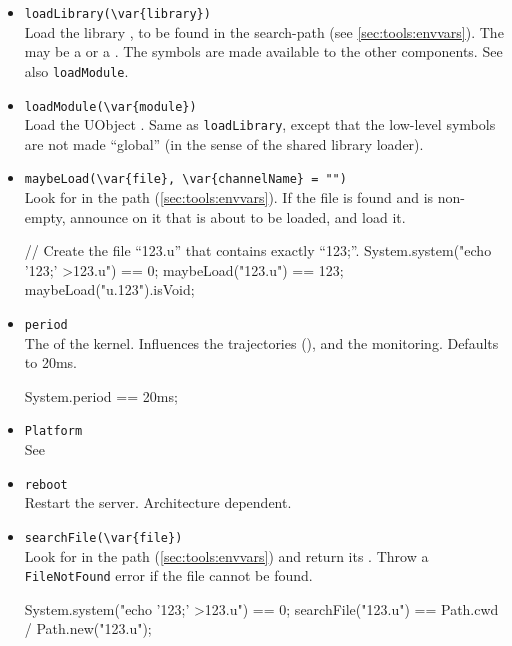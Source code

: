 \begin{itemize}
\item \lstinline|loadLibrary(\var{library})|\\
  Load the library , to be found in the
   search-path (see
  \autoref{sec:tools:envvars}).  The  may be a
   or a .  The \Cxx symbols are made
  available to the other \Cxx components.  See also
  \lstinline|loadModule|.

\item \lstinline|loadModule(\var{module})|\\
  Load the UObject .  Same as \lstinline|loadLibrary|,
  except that the low-level \Cxx symbols are not made ``global'' (in
  the sense of the shared library loader).

\item \lstinline|maybeLoad(\var{file}, \var{channelName} = "")|\\
  Look for  in the \urbi path
  (\autoref{sec:tools:envvars}).  If the file is found and
   is non-empty, announce on it that  is
  about to be loaded, and load it.

\begin{urbiassert}
// Create the file ``123.u'' that contains exactly ``123;''.
System.system("echo '123;' >123.u") == 0;
maybeLoad("123.u") == 123;
maybeLoad("u.123").isVoid;
\end{urbiassert}

\item \lstinline|period|\\
  The  of the \urbi kernel.  Influences the trajectories
  (), and the \uobject monitoring.
  Defaults to 20ms.
\begin{urbiassert}
System.period == 20ms;
\end{urbiassert}

\item \lstinline|Platform|\\
  See 

\item \lstinline|reboot|\\
  Restart the \urbi server.  Architecture dependent.

\item \lstinline|searchFile(\var{file})|\\
  Look for  in the \urbi path (\autoref{sec:tools:envvars})
  and return its .  Throw a \lstinline|FileNotFound|
  error if the file cannot be found.
\begin{urbiassert}
System.system("echo '123;' >123.u") == 0;
searchFile("123.u") == Path.cwd / Path.new("123.u");
\end{urbiassert}


\end{itemize}
